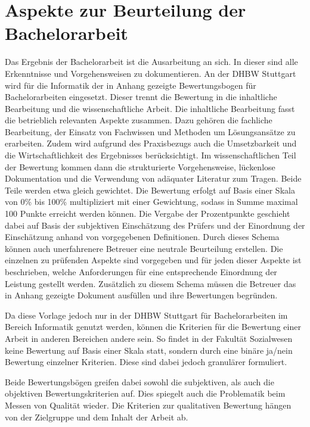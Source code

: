 \section{Aspekte zur Beurteilung der Bachelorarbeit}
Das Ergebnis der Bachelorarbeit ist die Ausarbeitung an sich. In dieser sind alle Erkenntnisse und Vorgehensweisen zu dokumentieren. An der \ac{DHBW} Stuttgart wird für die Informatik der in Anhang  gezeigte Bewertungsbogen für Bachelorarbeiten eingesetzt. Dieser trennt die Bewertung in die inhaltliche Bearbeitung und die wissenschaftliche Arbeit. Die inhaltliche Bearbeitung fasst die betrieblich relevanten Aspekte zusammen. Dazu gehören die fachliche Bearbeitung, der Einsatz von Fachwissen und Methoden um Lösungsansätze zu erarbeiten. Zudem wird aufgrund des Praxisbezugs auch die Umsetzbarkeit und die Wirtschaftlichkeit des Ergebnisses berücksichtigt. 
Im wissenschaftlichen Teil der Bewertung kommen dann die strukturierte Vorgehensweise, lückenlose Dokumentation und die Verwendung von adäquater Literatur zum Tragen. 
Beide Teile werden etwa gleich gewichtet. Die Bewertung erfolgt auf Basis einer Skala von 0\% bis 100\% multipliziert mit einer Gewichtung, sodass in Summe maximal 100 Punkte erreicht werden können. Die Vergabe der Prozentpunkte geschieht dabei auf Basis der subjektiven Einschätzung des Prüfers und der Einordnung der Einschätzung anhand von vorgegebenen Definitionen. 
Durch dieses Schema können auch unerfahrenere Betreuer eine neutrale Beurteilung erstellen. Die einzelnen zu prüfenden Aspekte sind vorgegeben und für jeden dieser Aspekte ist beschrieben, welche Anforderungen für eine entsprechende Einordnung der Leistung gestellt werden. 
Zusätzlich zu diesem Schema müssen die Betreuer das in Anhang  gezeigte Dokument ausfüllen und ihre Bewertungen begründen. 

Da diese Vorlage jedoch nur in der \ac{DHBW} Stuttgart für Bachelorarbeiten im Bereich Informatik genutzt werden, können die Kriterien für die Bewertung einer Arbeit in anderen Bereichen andere sein. So findet in der Fakultät Sozialwesen keine Bewertung auf Basis einer Skala statt, sondern durch eine binäre ja/nein Bewertung einzelner Kriterien. Diese sind dabei jedoch granulärer formuliert.\cite[Vgl.][]{DHBW-Sozial:2014}

Beide Bewertungsbögen greifen dabei sowohl die subjektiven, als auch die objektiven Bewertungskriterien auf. Dies spiegelt auch die Problematik beim Messen von Qualität wieder. Die Kriterien zur qualitativen Bewertung hängen von der Zielgruppe und dem Inhalt der Arbeit ab.

